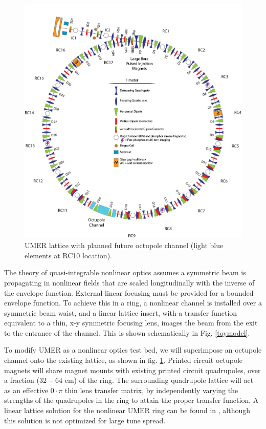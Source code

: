 \begin{figure}[]
\centering
\includegraphics[width=\textwidth]{umer-diagram/full_octu_ring.png}   
\caption{UMER lattice with planned future octupole channel (light blue elements at RC10 location).}
\label{fig:octring}
\end{figure}  


The theory of quasi-integrable nonlinear optics assumes a symmetric beam is propagating in nonlinear fields that are scaled longitudinally with the inverse of the envelope function. External linear focusing must be provided for a bounded envelope function. 
To achieve this in a ring, a nonlinear channel is installed over a symmetric beam waist, and a linear lattice insert,
with a transfer function equivalent to a thin, x-y symmetric focusing lens, images the beam from the exit to the entrance of the channel. This is shown schematically in Fig. \ref{toymodel}.

To modify UMER as a nonlinear optics test bed, we will superimpose an octupole channel onto the existing lattice, as shown in fig. \ref{fig:octring}.
Printed circuit octupole magnets will share magnet mounts with existing printed circuit quadrupoles, over a fraction ($32 - 64$ cm) of the ring. 
The surrounding quadrupole lattice will act as an effective $0 \cdot \pi$ thin lens transfer matrix, by independently varying the strengths of the quadrupoles in the ring to attain the proper transfer function. 
A linear lattice solution for the nonlinear UMER ring can be found in \cite{AAC}, although this solution is not optimized for large tune spread.


